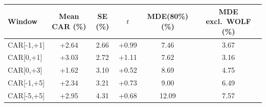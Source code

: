 \begin{tabular}{lccccc}
\toprule
Window & Mean CAR (\%) & SE (\%) & $t$ & MDE(80\%) (\%) & MDE excl.\ WOLF (\%) \\
\midrule
CAR[-1,+1] & +2.64 & 2.66 & +0.99 & 7.46 & 3.67 \\
CAR[0,+1] & +3.03 & 2.72 & +1.11 & 7.62 & 3.16 \\
CAR[0,+3] & +1.62 & 3.10 & +0.52 & 8.69 & 4.75 \\
CAR[-1,+5] & +2.34 & 3.21 & +0.73 & 9.00 & 6.49 \\
CAR[-5,+5] & +2.95 & 4.31 & +0.68 & 12.09 & 7.57 \\
\bottomrule
\end{tabular}
